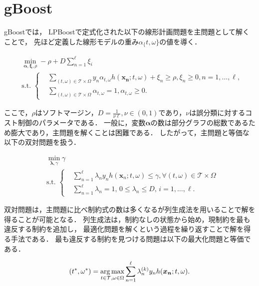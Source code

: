 \section{gBoost}
gBoostでは，
LPBoostで定式化された以下の線形計画問題を主問題として解くことで，
先ほど定義した線形モデルの重み$\alpha_\{t,\omega\}$の値を導く．

\begin{align}
	&\min_{\bm{\alpha},\bm{\xi},\rho} -\rho + D \sum_{n=1}^{\ell} \xi_{i} \nonumber\\
	&\text{s.t.} \,\,\left\{
	\begin{aligned}
		&\sum_{(t,\omega) \in \mathcal{T} \times \Omega} y_{n} \alpha_{t,\omega} h(\bm{x_{n}};t,\omega) + \xi_{n} \geq \rho,
		\xi_{n} \geq 0,	n = 1, \dots , \ell,\nonumber \\
		&\sum_{(t,\omega) \in \mathcal{T} \times \Omega} \alpha_{t, \omega} = 1, \alpha_{t, \omega} \geq 0.
	\end{aligned}\right.
\end{align}

ここで，$\rho$はソフトマージン，$D=\frac{1}{\nu \ell}, \nu \in (0,1)$であり，$\nu$は誤分類に対するコスト制御のパラメータである．
一般に，変数$\bm{\alpha}$の数は部分グラフの総数であるため膨大であり，主問題を解くことは困難である．
したがって，主問題と等価な以下の双対問題を扱う．

\begin{align}
	\label{eq:dualprob}
	&\min_{\bm{\lambda},\gamma} \gamma \nonumber\\
	&\text{s.t.} \,\,\left\{
	\begin{aligned}
		& \sum_{n=1}^{\ell} \lambda_{n} y_{n} h(\bm{x}_{n};t,\omega) \leq \gamma,
		\forall(t,\omega) \in \mathcal{T} \times \Omega\\
		& \sum_{n=1}^{\ell} \lambda_{n} = 1, \,0 \leq \lambda_{n} \leq D, \,i = 1, \dots , \ell. 
	\end{aligned}\right. \end{align}

双対問題は，主問題に比べ制約式の数は多くなるが列生成法を用いることで解を得ることが可能となる．
列生成法は，制約なしの状態から始め，現制約を最も違反する制約を追加し，
最適化問題を解くという過程を繰り返すことで解を得る手法である．
最も違反する制約を見つける問題は以下の最大化問題と等価である．

\begin{equation*}
	(t^{*}, \omega^{*}) = \operatorname*{arg\,max}_{t \in \mathcal{T} , \omega \in \Omega} \sum_{n=1}^{\ell} \lambda_{n}^{(k)} y_{n} h(\bm{x_{n}} ; t, \omega).
\end{equation*}

